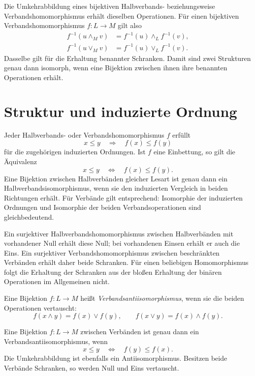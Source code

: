 \begin{theorem}[Isomorphiekriterium]
\label{b45guide:thm:inverse}
Die Umkehrabbildung eines bijektiven Halbverbands- beziehungsweise
Verbandshomomorphismus erhält dieselben Operationen.
Für einen bijektiven Verbandshomomorphismus $f:L\to M$ gilt also
\[
\begin{aligned}
 f^{-1}(u\wedge_M v)&=f^{-1}(u)\wedge_L f^{-1}(v),\\
 f^{-1}(u\vee_M v)&=f^{-1}(u)\vee_L f^{-1}(v).
\end{aligned}
\]
Dasselbe gilt für die Erhaltung benannter Schranken.
Damit sind zwei Strukturen genau dann isomorph, wenn eine
Bijektion zwischen ihnen ihre benannten Operationen erhält.
\end{theorem}

\section{Struktur und induzierte Ordnung}

\begin{theorem}
\label{b45guide:thm:order-embedding}
Jeder Halbverbands- oder Verbandshomomorphismus $f$ erfüllt
\[
 x\leq y\quad\Longrightarrow\quad f(x)\leq f(y)
\]
für die zugehörigen induzierten Ordnungen.
Ist $f$ eine Einbettung, so gilt die Äquivalenz
\[
 x\leq y\quad\Longleftrightarrow\quad f(x)\leq f(y).
\]
Eine Bijektion zwischen Halbverbänden gleicher Lesart ist genau
dann ein Halbverbandsisomorphismus, wenn sie den induzierten
Vergleich in beiden Richtungen erhält. Für Verbände gilt
entsprechend: Isomorphie der induzierten Ordnungen und Isomorphie
der beiden Verbandsoperationen sind gleichbedeutend.
\end{theorem}

\begin{theorem}
\label{b45guide:thm:surjective-bounds}
Ein surjektiver Halbverbandshomomorphismus zwischen Halbverbänden
mit vorhandener Null erhält diese Null; bei vorhandenen Einsen
erhält er auch die Eins. Ein surjektiver Verbandshomomorphismus
zwischen beschränkten Verbänden erhält daher beide Schranken.
Für einen beliebigen Homomorphismus folgt die Erhaltung der
Schranken aus der bloßen Erhaltung der binären Operationen
im Allgemeinen nicht.
\end{theorem}

\begin{definition}
Eine Bijektion $f:L\to M$ heißt \emph{Verbandsantiisomorphismus},
wenn sie die beiden Operationen vertauscht:
\[
 f(x\wedge y)=f(x)\vee f(y),\qquad
 f(x\vee y)=f(x)\wedge f(y).
\]
\end{definition}

\begin{theorem}
Eine Bijektion $f:L\to M$ zwischen Verbänden ist genau dann
ein Verbandsantiisomorphismus, wenn
\[
 x\leq y\quad\Longleftrightarrow\quad f(y)\leq f(x).
\]
Die Umkehrabbildung ist ebenfalls ein Antiisomorphismus.
Besitzen beide Verbände Schranken, so werden Null und Eins vertauscht.
\end{theorem}
